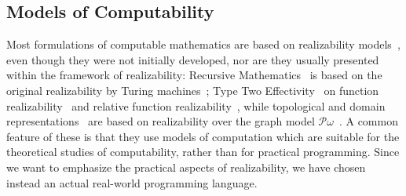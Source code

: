 \subsection{Models of Computability}
\label{sec:models-of-computability}
Most formulations of
computable mathematics are based on realizability
models~\cite{Bauer:00}, even though they were not initially developed,
nor are they usually presented within the framework of realizability:
Recursive Mathematics~\cite{ershov98:_handb_recur_mathem} is based on
the original realizability by Turing machines~\cite{KleeneSC:intint};
Type Two Effectivity~\cite{Wei00} on function
realizability~\cite{KleeneSC:fouim} and relative function
realizability~\cite{BirkedalL:devttc}, while topological and domain
representations~\cite{Bla97a,Bauer:Birkedal:Scott:98} are based on
realizability over the graph model
$\mathcal{P}\omega$~\cite{ScottD:dattl}. A common feature of these is
that they use models of computation which are suitable for the
theoretical studies of computability, rather than for practical
programming. Since we want to emphasize the practical aspects of
realizability, we have chosen instead an actual real-world programming
language.

